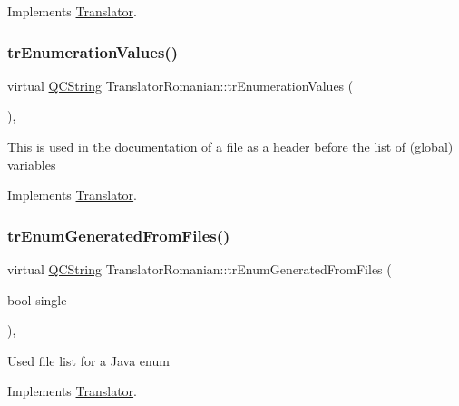 Implements \mbox{\hyperlink{class_translator}{Translator}}.

\mbox{\label{class_translator_romanian_afa79cf1023384a1cced0b165b3276af6}} 
\subsubsection{\texorpdfstring{trEnumerationValues()}{trEnumerationValues()}}
{\footnotesize\ttfamily virtual \mbox{\hyperlink{class_q_c_string}{Q\+C\+String}} Translator\+Romanian\+::tr\+Enumeration\+Values (\begin{DoxyParamCaption}{ }\end{DoxyParamCaption})\hspace{0.3cm}{\ttfamily [inline]}, {\ttfamily [virtual]}}

This is used in the documentation of a file as a header before the list of (global) variables 

Implements \mbox{\hyperlink{class_translator}{Translator}}.

\mbox{\label{class_translator_romanian_a0a8d062d8ca88dea27427d2286cbe975}} 
\subsubsection{\texorpdfstring{trEnumGeneratedFromFiles()}{trEnumGeneratedFromFiles()}}
{\footnotesize\ttfamily virtual \mbox{\hyperlink{class_q_c_string}{Q\+C\+String}} Translator\+Romanian\+::tr\+Enum\+Generated\+From\+Files (\begin{DoxyParamCaption}\item[{bool}]{single }\end{DoxyParamCaption})\hspace{0.3cm}{\ttfamily [inline]}, {\ttfamily [virtual]}}

Used file list for a Java enum 

Implements \mbox{\hyperlink{class_translator}{Translator}}.

\mbox{\label{class_translator_romanian_a01e2726eecc546cd1c601e7b62619b8a}} 
